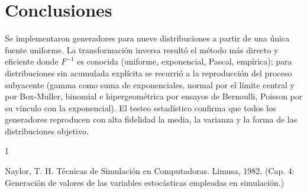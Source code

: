 \documentclass{article}
\begin{document}
\section{Conclusiones}
Se implementaron generadores para nueve distribuciones a partir de una única fuente uniforme. La transformación inversa resultó el método más directo y eficiente donde $F^{-1}$ es conocida (uniforme, exponencial, Pascal, empírica); para distribuciones sin acumulada explícita se recurrió a la reproducción del proceso subyacente (gamma como suma de exponenciales, normal por el límite central y por Box-Muller, binomial e hipergeométrica por ensayos de Bernoulli, Poisson por su vínculo con la exponencial). El testeo estadístico confirma que todos los generadores reproducen con alta fidelidad la media, la varianza y la forma de las distribuciones objetivo.





  


\renewcommand{\refname}{Bibliografía}

\begin{thebibliography}{1}


Naylor, T. H. Técnicas de Simulación en Computadoras. Limusa, 1982. (Cap. 4: Generación de valores de las variables estocásticas empleadas en simulación.)\\



\end{thebibliography}
\end{document}
